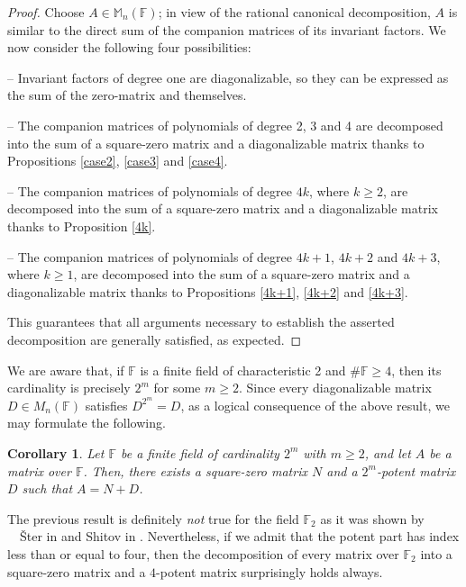 \documentclass{amsart}
\def\FF{\mathbb{F}}
\newtheorem{corollary}[theorem]{Corollary}
\theoremstyle{definition}
\theoremstyle{remark}
\numberwithin{equation}{section}
\begin{document}
\begin{proof} Choose $A\in\mathbb{M}_n(\mathbb{F})$; in view of the rational canonical decomposition, $A$ is similar to the direct sum of the companion matrices of its invariant factors. We now consider the following four possibilities:

\medskip

\noindent -- Invariant factors of degree one are diagonalizable, so they can be expressed as the sum of the zero-matrix and themselves.

\medskip

\noindent -- The companion matrices of polynomials of degree 2, 3 and 4 are decomposed into the sum of a square-zero matrix and a diagonalizable matrix thanks to Propositions \ref{case2}, \ref{case3} and \ref{case4}.

\medskip

\noindent -- The companion matrices of polynomials of degree $4k$, where $k\ge 2$, are decomposed into the sum of a square-zero matrix and a diagonalizable matrix thanks to Proposition \ref{4k}.

\medskip

\noindent -- The companion matrices of polynomials of degree $4k+1$, $4k+2$ and $4k+3$, where $k\ge 1$, are decomposed into the sum of a square-zero matrix and a diagonalizable matrix thanks to Propositions \ref{4k+1}, \ref{4k+2} and \ref{4k+3}.

\medskip

This guarantees that all arguments necessary to establish the asserted decomposition are generally satisfied, as expected.
\end{proof}

We are aware that, if $\FF$ is a finite field of characteristic 2 and $\#\FF\ge 4$, then its cardinality is precisely $2^m$ for some $m\ge 2$. Since every diagonalizable matrix $D\in M_n(\FF)$ satisfies $D^{2^m}=D$, as a logical consequence of the above result, we may formulate the following.

\begin{corollary}\label{potent2^m}
Let $\FF$ be a finite field of cardinality $2^m$ with $m\ge 2$, and let $A$ be a matrix over $\FF$. Then, there exists a square-zero matrix $N$ and a $2^m$-potent matrix $D$ such that $A=N+D$.
\end{corollary}

The previous result is definitely {\it not} true for the field $\FF_2$ as it was shown by \ ~\v{S}ter in \cite{St1} and Shitov in \cite{Sh}. Nevertheless, if we admit that the potent part has index less than or equal to four, then the decomposition of every matrix over $\FF_2$ into a square-zero matrix and a $4$-potent matrix surprisingly holds always.
\end{document}

